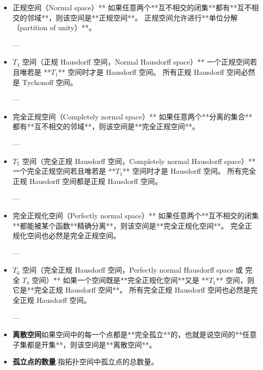 \begin{itemize}
---

\item 正规空间（Normal space）**
如果任意两个**互不相交的闭集**都有**互不相交的邻域**，则该空间是**正规空间**。
正规空间允许进行**单位分解（partition of unity）**。

---

\item $T_4$ 空间（正规 Hausdorff 空间，Normal Hausdorff space）**
一个正规空间若且唯若是 **$T_1$** 空间时才是 Hausdorff 空间。
所有正规 Hausdorff 空间必然是 Tychonoff 空间。

---

\item 完全正规空间（Completely normal space）**
如果任意两个**分离的集合**都有**互不相交的邻域**，则该空间是**完全正规空间**。

---

\item $T_5$ 空间（完全正规 Hausdorff 空间，Completely normal Hausdorff space）**
一个完全正规空间若且唯若是 **$T_1$** 空间时才是 Hausdorff 空间。
所有完全正规 Hausdorff 空间都是正规 Hausdorff 空间。

---

\item 完全正规化空间（Perfectly normal space）**
如果任意两个**互不相交的闭集**都能被某个函数**精确分离**，则该空间是**完全正规化空间**。
完全正规化空间也必然是完全正规空间。

---

\item $T_6$ 空间（完全正规 Hausdorff 空间，Perfectly normal Hausdorff space 或 完全 $T_4$ 空间）**
如果一个空间既是**完全正规化空间**又是 **$T_1$** 空间，则它是**完全正规 Hausdorff 空间**。
所有完全正规 Hausdorff 空间也必然是完全正规 Hausdorff 空间。

---

\item \textbf{离散空间}如果空间中的每一个点都是**完全孤立**的，也就是说空间的**任意子集都是开集**，则该空间是**离散空间**。
\item \textbf{孤立点的数量}.指拓扑空间中孤立点的总数量。

\end{itemize}
